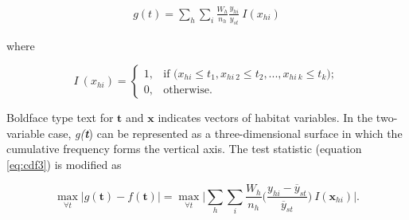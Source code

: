 \documentclass[11pt]{book}\usepackage[]{graphicx}\usepackage[]{color}
\begin{document}
\begin{align}
g(t) = \sum_{h}\sum_{i}\frac{W_h}{n_h}\frac{y_{hi}}{y_{st}}~I({x_{hi}}) %
\end{align}

where

\begin{equation*}  %
{I}~({x_{hi}})=\begin{cases}
1,& \text{if ($x_{hi}$}\leq t_{1},x_{hi~2} \leq t_2,...,x_{hi~k} \leq t_{k});\\    %
0,& \text{otherwise}.
\end{cases}
\end{equation*}

Boldface type text for $\boldsymbol{t}$ and $\boldsymbol{x}$ indicates vectors of habitat variables. In the two-variable case, \emph{g(\textbf{t}}) can be represented as a three-dimensional surface in which the cumulative frequency forms the vertical axis. The test statistic (equation \ref{eq:cdf3}) is modified as

\begin{equation} \label{eq:cdf5}
\max\limits_{\forall t} \vert g(\boldsymbol{t}) - f(\boldsymbol{t})\vert = \max\limits_{\forall t} \bigg|  \sum_{h}\sum_{i} \frac{W_h}{n_h} \bigg( \frac{{y_{hi}}-\overline{y}_{st}}{{\overline{y}_{st}}} \bigg) ~I(\boldsymbol{x}_{hi}) \bigg|.
\end{equation}
\end{document}
